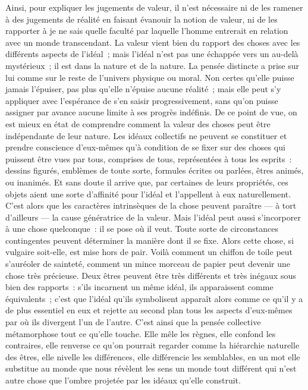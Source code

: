 \documentclass[french,twoside]{book} %
\begin{document}
Ainsi, pour expliquer les jugements de valeur, il n’est nécessaire ni de les ramener à des jugements de réalité en faisant évanouir la notion de valeur, ni de les rapporter à je ne sais quelle faculté par laquelle l’homme entrerait en relation avec un monde transcendant. La valeur vient bien du rapport des choses avec les différents aspects de l’idéal ; mais l’idéal n’est pas une échappée vers un au-delà mystérieux ; il est dans la nature et de la nature. La pensée distincte a prise sur lui comme sur le reste de l’univers physique ou moral. Non certes qu’elle puisse jamais l’épuiser, pas plus qu’elle n’épuise aucune réalité ; mais elle peut s’y appliquer avec l’espérance de s’en saisir progressivement, sans qu’on puisse assigner par avance aucune limite à ses progrès indéfinis. De ce point de vue, on est mieux en état de comprendre comment la valeur des choses peut être indépendante de leur nature. Les idéaux collectifs ne peuvent se constituer et prendre conscience d’eux-mêmes qu’à condition de se fixer sur des choses qui puissent être vues par tous, comprises de tous, représentées à tous les esprits : dessins figurés, emblèmes de toute sorte, formules écrites ou parlées, êtres animés, ou inanimés. Et sans doute il arrive que, par certaines de leurs propriétés, ces objets aient une sorte d’affinité pour l’idéal et l’appellent à eux naturellement. C’est alors que les caractères intrinsèques de la chose peuvent paraître — à tort d’ailleurs — la cause génératrice de la valeur. Mais l’idéal peut aussi s’incorporer à une chose quelconque : il se pose où il veut. Toute sorte de circonstances contingentes peuvent déterminer la manière dont il se fixe. Alors cette chose, si vulgaire soit-elle, est mise hors de pair. Voilà comment un chiffon de toile peut s’auréoler de sainteté, comment un mince morceau de papier peut devenir une chose très précieuse. Deux êtres peuvent être très différents et très inégaux sous bien des rapports : s’ils incarnent un même idéal, ils apparaissent comme équivalents ; c’est que l’idéal qu’ils symbolisent apparaît alors comme ce qu’il y a de plus essentiel en eux et rejette au second plan tous les aspects d’eux-mêmes par où ils divergent l’un de l’autre. C’est ainsi que la pensée collective métamorphose tout ce qu’elle touche. Elle mêle les règnes, elle confond les contraires, elle renverse ce qu’on pourrait regarder comme la hiérarchie naturelle des êtres, elle nivelle les différences, elle différencie les semblables, en un mot elle substitue au monde que nous révèlent les sens un monde tout différent qui n’est autre chose que l’ombre projetée par les idéaux qu’elle construit.
\end{document}
